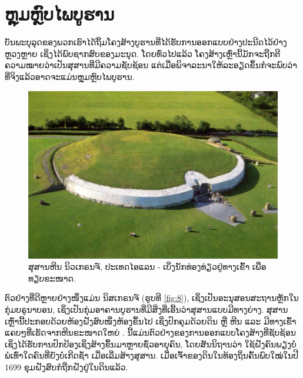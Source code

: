\documentclass[10pt,twocolumn,letterpaper]{article}
\begin{document}
\section{ຫຼຸມຫຼົບໄພບູຮານ}

ບັນພະບຸລຸດຂອງພວກເຮົາໄດ້ຖິ້ມໂຄງສ້າງບູຮານທີ່ໄດ້ຮັບການອອກແບບຢ່າງປະນີດໄວ້ຢ່າງຫຼວງຫຼາຍ ເຊິ່ງໄດ້ພົບຊາກສົບຂອງມະນຸດ. ໂດຍທົ່ວໄປແລ້ວ ໂຄງສ້າງເຫຼົ່ານີ້ມັກຈະຖືກຕີຄວາມໝາຍວ່າເປັນສຸສານທີ່ມີຄວາມຊັບຊ້ອນ ແຕ່ເມື່ອພິຈາລະນາໃຫ້ລະອຽດຂຶ້ນກໍຈະພົບວ່າ ທີ່ຈິງແລ້ວອາດຈະແມ່ນຫຼຸມຫຼົບໄພບູຮານ.

\begin{figure}[b]
\begin{center}
   \includegraphics[width=1\linewidth]{ww19.jpg}
\end{center}
   \caption{ສຸສານຫີນ ນິວເກຣນຈ໌, ປະເທດໄອແລນ - ເບິ່ງນັກທ່ອງທ່ຽວຢູ່ທາງເຂົ້າ ເພື່ອທຽບຂະໜາດ.}
\label{fig:8}
\label{fig:onecol}
\end{figure}

ຕົວຢ່າງທີ່ດີຫຼາຍຢ່າງໜຶ່ງແມ່ນ ນິສເກຣນຈ໌ (ຮູບທີ \ref{fig:8}), ເຊິ່ງເປັນອະນຸສອນສະຖານຫຼັກໃນກຸ່ມບຣູນາບອນ, ເຊິ່ງເປັນກຸ່ມອາຄານບູຮານທີ່ມີສິ່ງທີ່ເອີ້ນວ່າສຸສານແບບມີທາງຍ່າງ. ສຸສານເຫຼົ່ານີ້ປະກອບດ້ວຍຫ້ອງຝັງສົບໜຶ່ງຫ້ອງຂຶ້ນໄປ ເຊິ່ງປົກຄຸມດ້ວຍດິນ ຫຼື ຫີນ ແລະ ມີທາງເຂົ້າແຄບໆທີ່ເຮັດຈາກຫີນຂະໜາດໃຫຍ່ \cite{70}. ນີ້ແມ່ນຕົວຢ່າງຂອງການອອກແບບໂຄງສ້າງທີ່ຊັບຊ້ອນ ເຊິ່ງໄດ້ຮັບການປົກປ້ອງເຊິ່ງສ້າງຂຶ້ນມາຫຼາຍຊົ່ວອາຍຸຄົນ, ໂດຍສັນນິຖານວ່າ ໃຊ້ຝັງຄົນພຽງບໍ່ພໍເທົ່າໃດຄົນທີ່ຍັງບໍ່ເກີດຊ້ຳ ເມື່ອເລີ່ມສ້າງສຸສານ. ເມື່ອເຈົ້າຂອງດິນໃນທ້ອງຖິ່ນຄົ້ນພົບໃໝ່ໃນປີ 1699 ຂຸມຝັງສົບກໍຖືກຝັງຢູ່ໃນດິນແລ້ວ.
\end{document}
